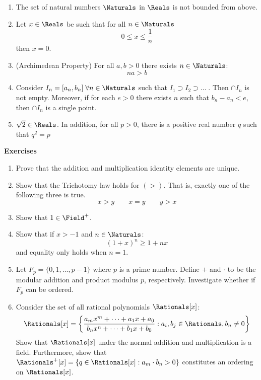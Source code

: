 \begin{results}
    \leavevmode
    \begin{enumerate}
        \item The set of natural numbers \(\Naturals\) in \(\Reals\) is not bounded from above.
        \item Let \(x \in \Reals\) be such that for all \(n \in \Naturals\)
              \[ 0\leq x \leq \dfrac{1}{n}\]
              then \(x = 0\).
        \item (Archimedean Property) For all \(a,b > 0\) there exists \(n \in \Naturals\):
              \[ na > b\]
        \item Consider \(I_n = [a_n,b_n] \;\forall n \in \Naturals \) such that \(I_1 \supset I_2 \supset \dots\;\). Then \(\cap{I_n}\) is not empty. Moreover, if for each \(e > 0\) there exists \( n\) such that \(b_n - a_n < e\), then \(\cap{I_n}\) is a single point.
        \item \(\sqrt{2} \in \Reals\). In addition, for all \(p > 0\), there is a positive real number \(q \) such that \(q^2 = p\)
    \end{enumerate}
\end{results}
\newpage
{\Large\textbf{Exercises}}
\begin{enumerate}
    \item Prove that the addition and multiplication identity elements are unique.
    \item Show that the Trichotomy law holds for \( (>) \). That is, exactly one of the following three is true.
          \[ x > y \qquad x = y \qquad y > x\]
    \item Show that \(1 \in \Field^+\).
    \item Show that if \(x > -1\) and \(n \in \Naturals\):
          \[(1 + x)^n \geq 1 + nx\]
          and equality only holds when \(n = 1\).
    \item Let \(F_p = \{ 0, 1, \dots, p -1 \}\) where \(p\) is a prime number. Define \(+\) and \(\cdot\) to be the modular addition and product modulus \(p\), respectively. Investigate whether if \(F_p\) can be ordered.
    \item Consider the set of all rational polynomials \(\Rationals[x]\):
          \[\Rationals[x] = \left\{ \frac{a_m x^m + \dots + a_1 x + a_0}{b_n x^n + \dots + b_1 x + b_0}: a_i, b_j \in \Rationals, b_n \neq 0\right\}\]
          Show that \(\Rationals[x]\) under the normal addition and multiplication is a field. Furthermore, show that \(\Rationals^+[x] = \{ q \in \Rationals[x] : a_m \cdot b_n > 0 \}\) constitutes an ordering on \(\Rationals[x]\).
\end{enumerate}

